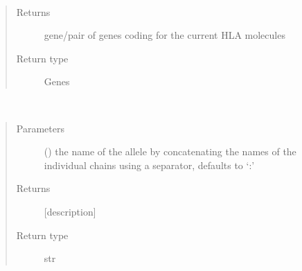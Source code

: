 \documentclass[letterpaper,10pt,english]{sphinxmanual}
\begin{document}
\begin{fulllineitems}

\begin{fulllineitems}
\label{\detokenize{IPTK.Classes:IPTK.Classes.HLAMolecules.HLAMolecule.get_gene}}~\begin{quote}\begin{description}
\item[{Returns}] \leavevmode
gene/pair of genes coding for the current HLA molecules

\item[{Return type}] \leavevmode
Genes

\end{description}\end{quote}

\end{fulllineitems}


\begin{fulllineitems}
\label{\detokenize{IPTK.Classes:IPTK.Classes.HLAMolecules.HLAMolecule.get_name}}~\begin{quote}\begin{description}
\item[{Parameters}] \leavevmode
{} (\sphinxstyleliteralemphasis{\sphinxupquote{, }}) \textendash{} the name of the allele by concatenating the names of the individual chains using         a separator, defaults to ‘:’

\item[{Returns}] \leavevmode
{[}description{]}

\item[{Return type}] \leavevmode
str

\end{description}\end{quote}


\end{fulllineitems}
\end{fulllineitems}
\end{document}
